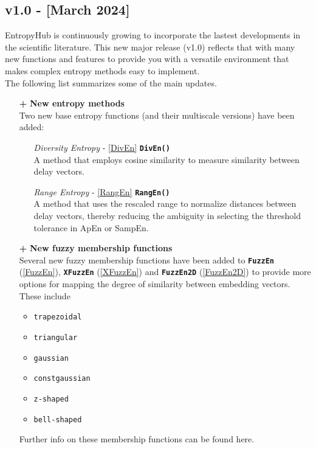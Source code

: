\documentclass[12pt, a4paper, titlepage, openany]{book}
\begin{document}
\subsection{\textbf{v1.0} - [March 2024]}
EntropyHub is continuously growing to incorporate the lastest developments in the scientific literature.
This new major release (v1.0) reflects that with many new functions and features to provide you with a versatile environment that makes complex entropy methods easy to implement.\\ 
The following list summarizes some of the main updates.
\begin{itemize}
\item[\textbf{+}] \textbf{New entropy methods}\\
Two new base entropy functions (and their multiscale versions) have been added:
\begin{itemize}
\item[] \emph{Diversity Entropy} - \ref{DivEn} \hspace{17mm}\texttt{\textbf{DivEn()}} \\
A method that employs cosine similarity to measure similarity between delay vectors.\cite{Div1}
\item[] \emph{Range Entropy} - \ref{RangEn} \hspace{20mm} \texttt{\textbf{RangEn()}}\\
A method that uses the rescaled range to normalize distances between delay vectors, thereby reducing the ambiguity in selecting the threshold tolerance in ApEn or SampEn.\cite{Rang1}
\end{itemize}

\item[\textbf{+}] \textbf{New fuzzy membership functions} \\
Several new fuzzy membership functions have been added to \texttt{\textbf{FuzzEn}} (\ref{FuzzEn}), \texttt{\textbf{XFuzzEn}} (\ref{XFuzzEn}) and \texttt{\textbf{FuzzEn2D}} (\ref{FuzzEn2D}) to provide more options for mapping the degree of similarity between embedding vectors.
These include
\begin{itemize}
\item \texttt{trapezoidal}
\item \texttt{triangular} 
\item \texttt{gaussian}
\item \texttt{constgaussian}
\item \texttt{z-shaped}
\item \texttt{bell-shaped}
\end{itemize} 
Further info on these membership functions can be found here.


\end{itemize}
\end{document}

